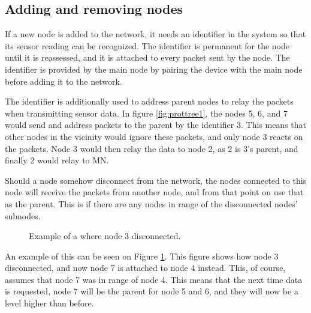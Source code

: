 \subsection*{Adding and removing nodes}
If a new node is added to the network, it needs an identifier in the system so that its sensor reading can be recognized. The identifier is permanent for the node until it is reassessed, and it is attached to every packet sent by the node.
The identifier is provided by the main node by pairing the device with the main node before adding it to the network. 

The identifier is additionally used to address parent nodes to relay the packets when transmitting sensor data. In figure \ref{fig:prottree1}, the nodes 5, 6, and 7 would send and address packets to the parent by the identifier 3. This means that other nodes in the vicinity would ignore these packets, and only node 3 reacts on the packets. Node 3 would then relay the data to node 2, as 2 is 3's parent, and finally 2 would relay to MN.

Should a node somehow disconnect from the network, the nodes connected to this node will receive the packets from another node, and from that point on use that as the parent. This is if there are any nodes in range of the disconnected nodes' subnodes. 

\begin{figure}[!h]
	\centering
	\caption{Example of a where node 3 disconnected.}
	\label{fig:prottree2}
\end{figure}

An example of this can be seen on Figure \ref{fig:prottree2}. This figure shows how node 3 disconnected, and now node 7 is attached to node 4 instead. This, of course, assumes that node 7 was in range of node 4.
This means that the next time data is requested, node 7 will be the parent for node 5 and 6, and they will now be a level higher than before.


